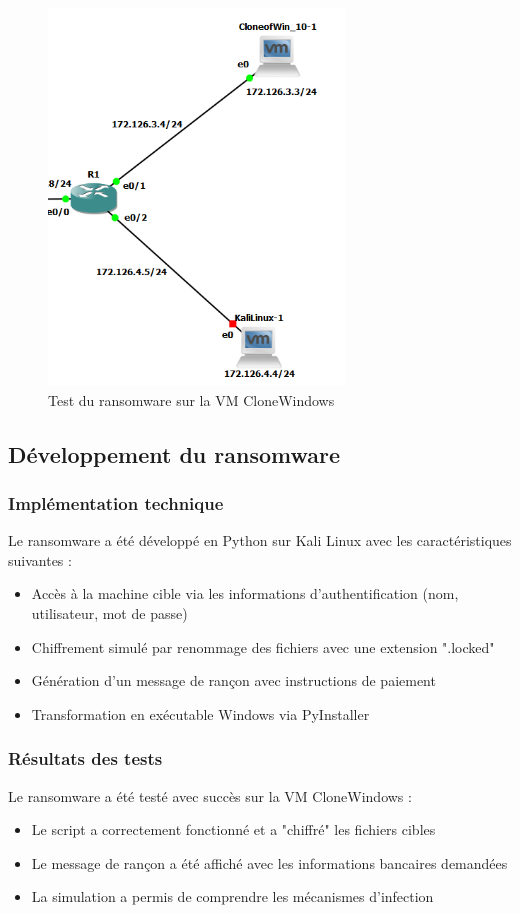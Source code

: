 \documentclass[12pt,a4paper]{article}
\begin{document}
	\begin{figure}[H]
		\centering
		\includegraphics[width=0.7\textwidth]{cap.PNG}
		\caption{Test du ransomware sur la VM CloneWindows}
		\label{fig:ransomware}
	\end{figure}
	
	\subsection{Développement du ransomware}
	
	\subsubsection{Implémentation technique}
	Le ransomware a été développé en Python sur Kali Linux avec les caractéristiques suivantes :
	\begin{itemize}
		\item Accès à la machine cible via les informations d'authentification (nom, utilisateur, mot de passe)
		\item Chiffrement simulé par renommage des fichiers avec une extension ".locked"
		\item Génération d'un message de rançon avec instructions de paiement
		\item Transformation en exécutable Windows via PyInstaller
	\end{itemize}
	
	\subsubsection{Résultats des tests}
	Le ransomware a été testé avec succès sur la VM CloneWindows :
	\begin{itemize}
		\item Le script a correctement fonctionné et a "chiffré" les fichiers cibles
		\item Le message de rançon a été affiché avec les informations bancaires demandées
		\item La simulation a permis de comprendre les mécanismes d'infection
	\end{itemize}
	
\end{document}
